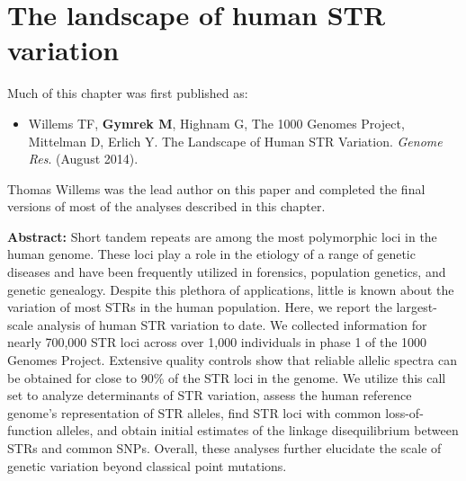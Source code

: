 \chapter{The landscape of human STR variation}
\label{chap:catalog}

\hzline

Much of this chapter was first published as:

\begin{itemize}
\item[] Willems TF, \textbf{Gymrek M}, Highnam G, The 1000 Genomes Project, Mittelman D, Erlich Y. The
  Landscape of Human STR Variation. \emph{Genome Res}. (August 2014).
\end{itemize}

Thomas Willems was the lead author on this paper and completed the final versions of most of the analyses described in this chapter.

\hzline

\textbf{Abstract:} Short tandem repeats are among the most polymorphic loci in the human genome. These loci play a role in the etiology of a range of genetic diseases and have been frequently utilized in forensics, population genetics, and genetic genealogy. Despite this plethora of applications, little is known about the variation of most STRs in the human population. Here, we report the largest-scale analysis of human STR variation to date. We collected information for nearly 700,000 STR loci across over 1,000 individuals in phase 1 of the 1000 Genomes Project. Extensive quality controls show that reliable allelic spectra can be obtained for close to 90\% of the STR loci in the genome. We utilize this call set to analyze determinants of STR variation, assess the human reference genome's representation of STR alleles, find STR loci with common loss-of-function alleles, and obtain initial estimates of the linkage disequilibrium between STRs and common SNPs. Overall, these analyses further elucidate the scale of genetic variation beyond classical point mutations.

